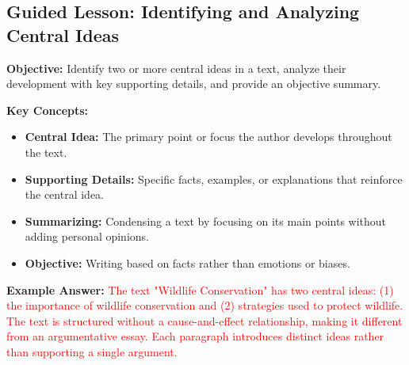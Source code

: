\documentclass[12pt]{article}
\begin{document}
\subsection*{Guided Lesson: Identifying and Analyzing Central Ideas}
\onehalfspacing

\begin{tcolorbox}[colframe=black!40, colback=gray!5, coltitle=black, colbacktitle=black!20, fonttitle=\bfseries\Large, title=Learning Objective, halign title=center, left=5pt, right=5pt, top=5pt, bottom=15pt]
\textbf{Objective:} Identify two or more central ideas in a text, analyze their development with key supporting details, and provide an objective summary.
\end{tcolorbox}

\begin{tcolorbox}[colframe=black!60, colback=white, coltitle=black, colbacktitle=black!15, fonttitle=\bfseries\Large, title=Key Concepts and Vocabulary, halign title=center]
\textbf{Key Concepts:}
\begin{itemize}
    \item \textbf{Central Idea:} The primary point or focus the author develops throughout the text.
    \item \textbf{Supporting Details:} Specific facts, examples, or explanations that reinforce the central idea.
    \item \textbf{Summarizing:} Condensing a text by focusing on its main points without adding personal opinions.
    \item \textbf{Objective:} Writing based on facts rather than emotions or biases.
\end{itemize}
\end{tcolorbox}

\begin{tcolorbox}[colframe=black!60, colback=white, coltitle=black, colbacktitle=black!15, fonttitle=\bfseries\Large, title=Example: Summarizing a Text with Multiple Central Ideas, halign title=center]
\textbf{Example Answer:}
\textcolor{red}{The text "Wildlife Conservation" has two central ideas: (1) the importance of wildlife conservation and (2) strategies used to protect wildlife. The text is structured without a cause-and-effect relationship, making it different from an argumentative essay. Each paragraph introduces distinct ideas rather than supporting a single argument.}
\end{tcolorbox}
\end{document}
